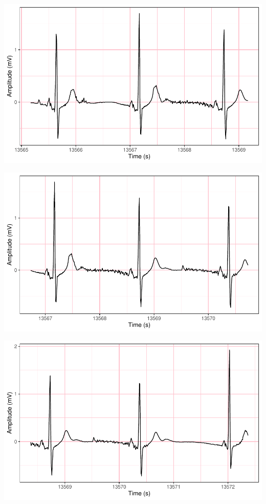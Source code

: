 \documentclass[
]{article}
\begin{document}
\begin{center}\includegraphics{report_files/figure-latex/abnormal-interval-27} \end{center}

\begin{center}\includegraphics{report_files/figure-latex/abnormal-interval-28} \end{center}

\begin{center}\includegraphics{report_files/figure-latex/abnormal-interval-29} \end{center}
\end{document}
